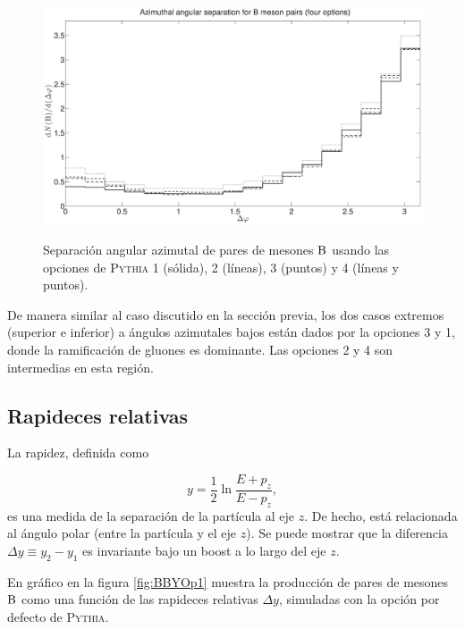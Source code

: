 \begin{figure}[!h]
\centering
\caption[Separación angular de pares de mesones $\B$. Cuatro opciones de \textsc{Pythia}.]{Separación angular azimutal de pares de mesones $\B$ usando las opciones de \textsc{Pythia} 1 (sólida), 2 (líneas), 3 (puntos) y 4 (líneas y puntos).}
\includegraphics[width=15cm]{BBPhi4Op}
\label{fig:BBPhi4Op}
\end{figure}
De manera similar al caso discutido en la sección previa, los dos casos extremos (superior e inferior) a ángulos azimutales bajos están dados por la opciones 3 y 1, donde la ramificación de gluones es dominante. Las opciones 2 y 4 son intermedias en esta región.

\subsection{Rapideces relativas}

La rapidez, definida como

$$
y =\frac12 \ln \frac{E+p_z}{E-p_z},
$$
es una medida de la separación de la partícula al eje $z$. De hecho, está relacionada al ángulo polar (entre la partícula y el eje $z$). Se puede mostrar que la diferencia $\Delta y \equiv y_2 - y_1$ es invariante bajo un boost a lo largo del eje $z$.

En gráfico en la figura \ref{fig:BBYOp1} muestra la producción de pares de mesones $\B$ como una función de las rapideces relativas $\Delta y$, simuladas con la opción por defecto de \textsc{Pythia}.

